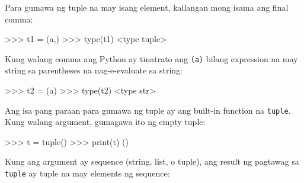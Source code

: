 \documentclass[10pt,]{book}
\newenvironment{Shaded}{}{}
\newcommand{\BuiltInTok}[1]{\textcolor[rgb]{0.00,0.50,0.00}{#1}}
\newcommand{\NormalTok}[1]{#1}
\newcommand{\OperatorTok}[1]{\textcolor[rgb]{0.40,0.40,0.40}{#1}}
\newcommand{\StringTok}[1]{\textcolor[rgb]{0.25,0.44,0.63}{#1}}
\begin{document}
Para gumawa ng tuple na may isang element, kailangan mong isama ang
final comma:

 

\begin{Shaded}
\begin{Highlighting}[]
\OperatorTok{\textgreater{}\textgreater{}\textgreater{}}\NormalTok{ t1 }\OperatorTok{=}\NormalTok{ (}\StringTok{\textquotesingle{}a\textquotesingle{}}\NormalTok{,)}
\OperatorTok{\textgreater{}\textgreater{}\textgreater{}} \BuiltInTok{type}\NormalTok{(t1)}
\OperatorTok{\textless{}}\BuiltInTok{type} \StringTok{\textquotesingle{}tuple\textquotesingle{}}\OperatorTok{\textgreater{}}
\end{Highlighting}
\end{Shaded}

Kung walang comma ang Python ay tinatrato ang
\texttt{(\textquotesingle{}a\textquotesingle{})} bilang expression na
may string sa parentheses na nag-e-evaluate sa string:

\begin{Shaded}
\begin{Highlighting}[]
\OperatorTok{\textgreater{}\textgreater{}\textgreater{}}\NormalTok{ t2 }\OperatorTok{=}\NormalTok{ (}\StringTok{\textquotesingle{}a\textquotesingle{}}\NormalTok{)}
\OperatorTok{\textgreater{}\textgreater{}\textgreater{}} \BuiltInTok{type}\NormalTok{(t2)}
\OperatorTok{\textless{}}\BuiltInTok{type} \StringTok{\textquotesingle{}str\textquotesingle{}}\OperatorTok{\textgreater{}}
\end{Highlighting}
\end{Shaded}

Ang isa pang paraan para gumawa ng tuple ay ang built-in function na
\texttt{tuple}. Kung walang argument, gumagawa ito ng empty tuple:

 

\begin{Shaded}
\begin{Highlighting}[]
\OperatorTok{\textgreater{}\textgreater{}\textgreater{}}\NormalTok{ t }\OperatorTok{=} \BuiltInTok{tuple}\NormalTok{()}
\OperatorTok{\textgreater{}\textgreater{}\textgreater{}} \BuiltInTok{print}\NormalTok{(t)}
\NormalTok{()}
\end{Highlighting}
\end{Shaded}

Kung ang argument ay sequence (string, list, o tuple), ang result ng
pagtawag sa \texttt{tuple} ay tuple na may elements ng sequence:
\end{document}
